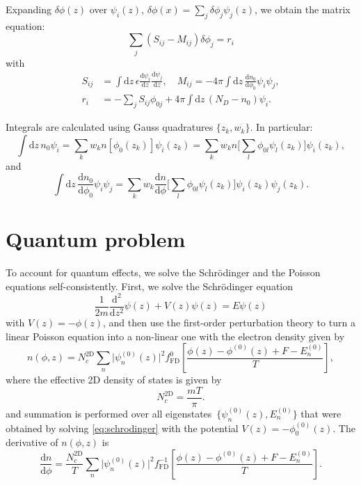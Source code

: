 \documentclass[10pt]{article}
\newcommand{\dd}{\mathrm{d}}
\newcommand{\fFD}{f_{\mathrm{FD}}}
\begin{document}
Expanding $\delta\phi(z)$ over $\psi_i(z)$, $\delta\phi(x) = \sum_j \delta\phi_j \psi_j(z)$,
we obtain the matrix equation:
\begin{equation}
	\sum_j \left( S_{ij} - M_{ij} \right) \delta\phi_j = r_i
\end{equation}
with
\begin{equation}
\begin{split}
	S_{ij} &= \int \dd z \, \epsilon \frac{\dd \psi_i}{\dd z} \frac{\dd \psi_j}{\dd z}, \quad
	M_{ij} = -4\pi \int \dd z \, \frac{\dd n_0}{\dd \phi_0} \psi_i \psi_j, \\
	r_i &= - \sum_j S_{ij} \phi_{0j} + 4\pi \int \dd z \, (N_D - n_0) \psi_i.
\end{split}
\end{equation}

Integrals are calculated using Gauss quadratures $\{z_k, w_k\}$. In particular:
\begin{equation}
	\int \dd z \, n_0 \psi_i = \sum_k w_k n[\phi_0(z_k)] \psi_i(z_k)
	= \sum_k w_k n\Big[ \sum_l \phi_{0l} \psi_l(z_k) \Big] \psi_i(z_k),
\end{equation}
and
\begin{equation}
	\int \dd z \, \frac{\dd n_0}{\dd \phi_0} \psi_i \psi_j
	= \sum_k w_k \frac{\dd n}{\dd \phi}
		\Big[ \sum_l \phi_{0l} \psi_l(z_k) \Big] \psi_i(z_k) \psi_j(z_k).
\end{equation}

\section{Quantum problem}

To account for quantum effects, we solve the Schr\"odinger and the Poisson
equations self-consistently. First, we solve the Schr\"odinger equation
\begin{equation}
	\label{eq:schrodinger}
	\frac{1}{2m} \frac{\dd^2}{\dd z^2} \psi(z) + V(z) \psi(z) = E \psi(z)
\end{equation}
with $V(z) = -\phi(z)$, and then use the first-order perturbation theory to turn a
linear Poisson equation into a non-linear one with the electron density given by
\begin{equation}
	n(\phi, z) = N_c^\mathrm{2D} \sum_n \lvert\psi_n^{(0)}(z)\rvert^2 \fFD^0
				 \left[ \frac{\phi(z) - \phi^{(0)}(z) + F - E_n^{(0)}}{T} \right],
\end{equation}
where the effective 2D density of states is given by
\begin{equation}
	N_c^\mathrm{2D} = \frac{m T}{\pi}.
\end{equation}
and summation is performed over all eigenstates~$\{ \psi_n^{(0)}(z), E_n^{(0)} \}$
that were obtained by solving \eqref{eq:schrodinger} with the potential
$V(z) = -\phi_0^{(0)}(z)$. The derivative of $n(\phi, z)$ is
\begin{equation}
	\frac{\dd n}{\dd \phi} =
		\frac{N_c^\mathrm{2D}}{T} \sum_n \lvert\psi_n^{(0)}(z)\rvert^2 \fFD^{-1}
		\left[ \frac{\phi(z) - \phi^{(0)}(z) + F - E_n^{(0)}}{T} \right].
\end{equation}
\end{document}
